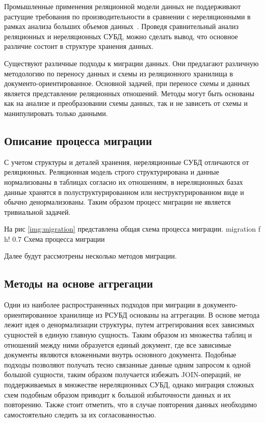 Промышленные применения реляционной модели данных не поддерживают растущие требования
по производительности в сравнении с нереляционными в рамках анализа больших объемов данных~\cite{migration}.
Проведя сравнительный анализ реляционных и нереляционных СУБД, можно сделать вывод, 
что основное различие состоит в структуре хранения данных.

Существуют различные подходы к миграции данных.
Они предлагают различную методологию по переносу данных и схемы 
из реляционного хранилища в документо-ориентированное.
Основной задачей, при переносе схемы и данных является представление реляционных отношений.
Методы могут быть основаны как на анализе и преобразовании схемы данных, 
так и не зависеть от схемы и манипулировать только данными.

\subsection{Описание процесса миграции}
С учетом структуры и деталей хранения, нереляционные СУБД отличаются от реляционных.
Реляционная модель строго структурирована и данные нормализованы в таблицах согласно их отношениям,
в нереляционных базах данные хранятся в полуструктурированном или неструктурированном виде 
и обычно денормализованы.
Таким образом процесс миграции не является тривиальной задачей.

На рис \ref{img:migration} представлена общая схема процесса миграции.
  {migration} %
  {f} %
  {h!} %
  {0.7\textwidth} %
{Схема процесса миграции} %

Далее будут рассмотрены несколько методов миграции.

\clearpage
\subsection{Методы на основе аггрегации}
Одни из наиболее распространенных подходов при миграции в документо-ориентированное хранилище из РСУБД основаны на аггрегации.
В основе метода лежит идея о денормализации структуры, путем аггрегирования всех зависимых сущностей в единую главную сущность.
Таким образом из множества таблиц и отношений между ними образуется единый документ, где все зависимые документы являются вложенными внутрь основного документа.
Подобные подходы позволяют получать тесно связанные данные одним запросом к одной большой сущности,
таким образом получается избежать JOIN-операций, не поддерживаемых в множестве нереляционных СУБД,
однако миграция сложных схем подобным образом приводит к большой избыточности данных и их повторению.
Также стоит отметить, что в случае повторения данных необходимо самостоятельно следить за их согласованностью.

